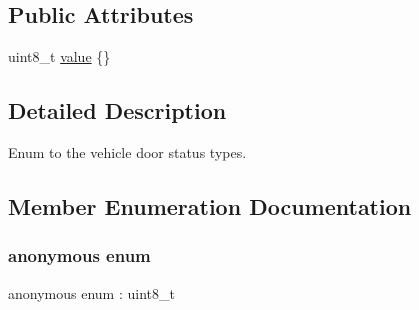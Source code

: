 \subsection*{Public Attributes}
\begin{DoxyCompactItemize}
\item 
uint8\+\_\+t \hyperlink{structmaf__perception__interface_1_1VehicleDoorStateEnum_a08907fd70bf3cf5b1d774101a92a096b}{value} \{\}
\end{DoxyCompactItemize}


\subsection{Detailed Description}
Enum to the vehicle door status types. 

\subsection{Member Enumeration Documentation}
\mbox{\label{structmaf__perception__interface_1_1VehicleDoorStateEnum_a7a0abd02235465d28d4f50e055d2dcc9}} 
\subsubsection{\texorpdfstring{anonymous enum}{anonymous enum}}
{\footnotesize\ttfamily anonymous enum \+: uint8\+\_\+t}

